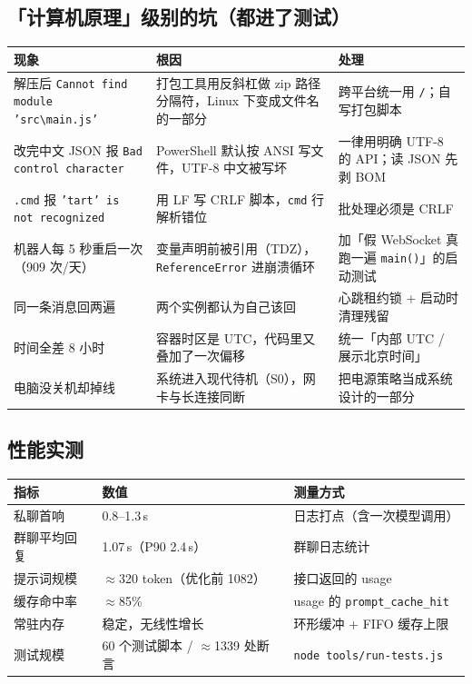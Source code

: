 \documentclass[11pt,a4paper]{ctexart}
\begin{document}
\subsection{「计算机原理」级别的坑（都进了测试）}

\begin{table}[H]
\centering\footnotesize
\begin{tabularx}{\textwidth}{@{}p{4.3cm}p{5.1cm}X@{}}
\toprule
现象 & 根因 & 处理 \\
\midrule
解压后 \texttt{Cannot find module 'src\textbackslash{}main.js'} & 打包工具用反斜杠做 zip 路径分隔符，Linux 下变成文件名的一部分 & 跨平台统一用 \texttt{/}；自写打包脚本 \\
改完中文 JSON 报 \texttt{Bad control character} & PowerShell 默认按 ANSI 写文件，UTF-8 中文被写坏 & 一律用明确 UTF-8 的 API；读 JSON 先剥 BOM \\
\texttt{.cmd} 报 \texttt{'tart' is not recognized} & 用 LF 写 CRLF 脚本，\texttt{cmd} 行解析错位 & 批处理必须是 CRLF \\
机器人每 5 秒重启一次（909 次/天） & 变量声明前被引用（TDZ），\texttt{ReferenceError} 进崩溃循环 & 加「假 WebSocket 真跑一遍 \texttt{main()}」的启动测试 \\
同一条消息回两遍 & 两个实例都认为自己该回 & 心跳租约锁 + 启动时清理残留 \\
时间全差 8 小时 & 容器时区是 UTC，代码里又叠加了一次偏移 & 统一「内部 UTC / 展示北京时间」 \\
电脑没关机却掉线 & 系统进入现代待机（S0），网卡与长连接同断 & 把电源策略当成系统设计的一部分 \\
\bottomrule
\end{tabularx}
\end{table}

\subsection{性能实测}

\begin{table}[H]
\centering\small
\begin{tabular}{@{}lll@{}}
\toprule
指标 & 数值 & 测量方式 \\
\midrule
私聊首响 & 0.8–1.3\,s & 日志打点（含一次模型调用） \\
群聊平均回复 & 1.07\,s（P90 2.4\,s） & 群聊日志统计 \\
提示词规模 & $\approx$320 token（优化前 1082） & 接口返回的 usage \\
缓存命中率 & $\approx$85\% & usage 的 \texttt{prompt\_cache\_hit} \\
常驻内存 & 稳定，无线性增长 & 环形缓冲 + FIFO 缓存上限 \\
测试规模 & 60 个测试脚本 / $\approx$1339 处断言 & \texttt{node tools/run-tests.js} \\
\bottomrule
\end{tabular}
\end{table}
\end{document}
